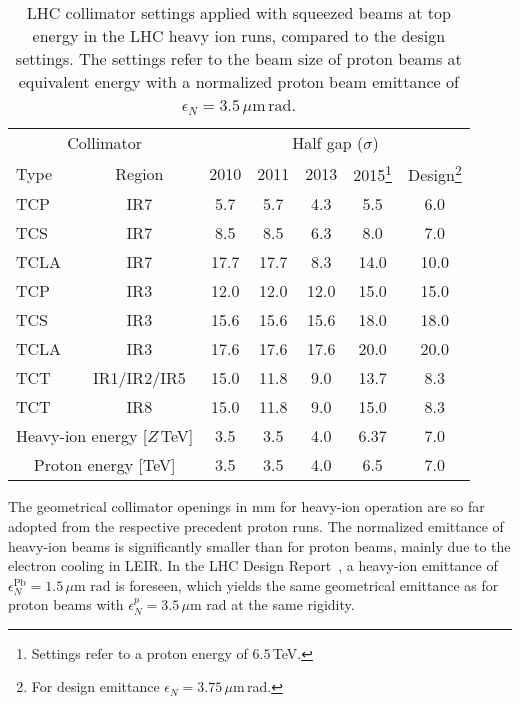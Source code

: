 %
\begin{table}[t]
\caption{LHC collimator settings applied with squeezed beams at top energy in the LHC heavy ion runs, compared to the design settings. The settings refer to the beam size of proton beams at equivalent energy with a normalized proton beam emittance of $\epsilon_N = 3.5\,\mu$m$\,$rad. }
%
\small
\begin{center}
\begin{minipage}{10cm}
\begin{tabular}{lcccccc}
\toprule
\midrule
 \multicolumn{2}{c}{Collimator} & \multicolumn{5}{c}{Half gap ($\sigma$)} \\
Type & Region & 2010 & 2011 & 2013 & 2015\footnote{Settings refer to a proton energy of $6.5\,$TeV.} & Design\footnote{For design emittance $\epsilon_N=3.75\,\mu$m$\,$rad.} \\ \midrule
TCP  & IR7 & 5.7  & 5.7  & 4.3     & 5.5  & 6.0  \\
TCS  & IR7 & 8.5  & 8.5  & 6.3     & 8.0  & 7.0  \\
TCLA & IR7 & 17.7 & 17.7 & 8.3     & 14.0 & 10.0 \\ \midrule
TCP  & IR3 & 12.0 & 12.0 & 12.0    & 15.0 & 15.0 \\
TCS  & IR3 & 15.6 & 15.6 & 15.6    & 18.0 & 18.0 \\
TCLA & IR3 & 17.6 & 17.6 & 17.6    & 20.0 & 20.0 \\ \midrule
TCT  & IR1/IR2/IR5        & 15.0 & 11.8 &  9.0 & 13.7& 8.3  \\         
TCT  & IR8                & 15.0 & 11.8 &  9.0 & 15.0& 8.3  \\ \midrule \midrule
\multicolumn{2}{c}{Heavy-ion energy [$Z\,$TeV]} & 3.5 & 3.5 & 4.0 & 6.37& 7.0 \\
\multicolumn{2}{c}{Proton energy [TeV]} & 3.5 & 3.5 & 4.0 & 6.5& 7.0 \\
\bottomrule
\end{tabular}
\end{minipage}
\end{center}
\label{tab:14070901}
\end{table}
%
The geometrical collimator openings in mm for heavy-ion operation are so far adopted from the respective precedent proton runs. The normalized emittance of heavy-ion beams is significantly smaller than for proton beams, mainly due to the electron cooling in LEIR. In the LHC Design Report~\citedr, a heavy-ion emittance of $\epsilon_N^{\text{Pb}} = 1.5\,\mu$m rad is foreseen, which yields the same geometrical emittance as for proton beams with $\epsilon_N^p = 3.5\,\mu$m rad at the same rigidity. 

